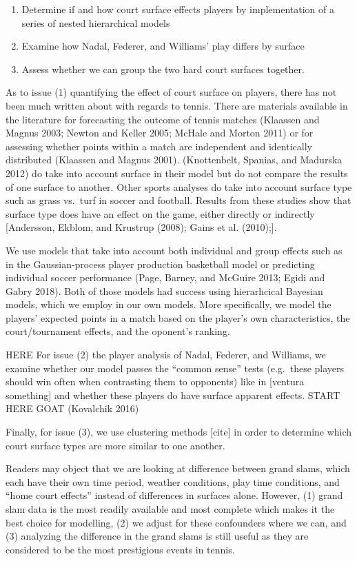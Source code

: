 \documentclass[]{article}
\begin{document}
\begin{enumerate}
\def\labelenumi{\arabic{enumi}.}
\item
  Determine if and how court surface effects players by implementation
  of a series of nested hierarchical models
\item
  Examine how Nadal, Federer, and Williams' play differs by surface
\item
  Assess whether we can group the two hard court surfaces together.
\end{enumerate}

As to issue (1) quantifying the effect of court surface on players,
there has not been much written about with regards to tennis. There are
materials available in the literature for forecasting the outcome of
tennis matches (Klaassen and Magnus 2003; Newton and Keller 2005; McHale
and Morton 2011) or for assessing whether points within a match are
independent and identically distributed (Klaassen and Magnus 2001).
(Knottenbelt, Spanias, and Madurska 2012) do take into account surface
in their model but do not compare the results of one surface to another.
Other sports analyses do take into account surface type such as grass
vs.~turf in soccer and football. Results from these studies show that
surface type does have an effect on the game, either directly or
indirectly {[}Andersson, Ekblom, and Krustrup (2008); Gains et al.
(2010);{]}.

We use models that take into account both individual and group effects
such as in the Gaussian-process player production basketball model or
predicting individual soccer performance (Page, Barney, and McGuire
2013; Egidi and Gabry 2018). Both of those models had success using
hierarhcical Bayesian models, which we employ in our own models. More
specifically, we model the players' expected points in a match based on
the player's own characteristics, the court/tournament effects, and the
oponent's ranking.

HERE For issue (2) the player analysis of Nadal, Federer, and Williams,
we examine whether our model passes the ``common sense'' tests
(e.g.~these players should win often when contrasting them to opponents)
like in {[}ventura something{]} and whether these players do have
surface apparent effects. START HERE GOAT (Kovalchik 2016)

Finally, for issue (3), we use clustering methods {[}cite{]} in order to
determine which court surface types are more similar to one another.

Readers may object that we are looking at difference between grand
slams, which each have their own time period, weather conditions, play
time conditions, and ``home court effects'' instead of differences in
surfaces alone. However, (1) grand slam data is the most readily
available and most complete which makes it the best choice for
modelling, (2) we adjust for these confounders where we can, and (3)
analyzing the difference in the grand slams is still useful as they are
considered to be the most prestigious events in tennis.
\end{document}
